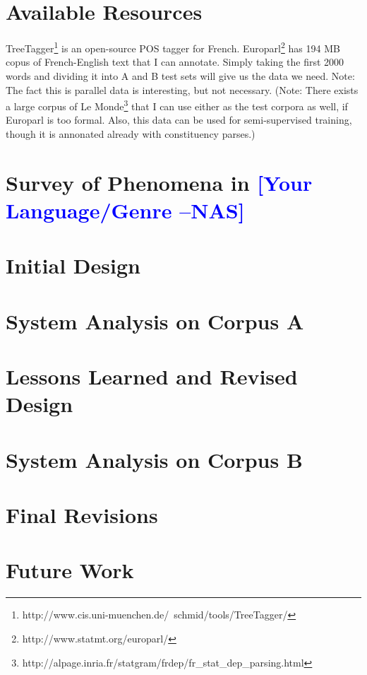 \documentclass[11pt,letterpaper]{article}
\newcommand{\nascomment}[1]{\textcolor{blue}{\textbf{[#1 --NAS]}}}
\begin{document}
\section{Available Resources}
TreeTagger\footnote{http://www.cis.uni-muenchen.de/~schmid/tools/TreeTagger/} is an open-source POS tagger for French. Europarl\footnote{http://www.statmt.org/europarl/} has 194 MB copus of French-English text that I can annotate. Simply taking the first 2000 words and dividing it into A and B test sets will give us the data we need. Note: The fact this is parallel data is interesting, but not necessary. (Note: There exists a large corpus of Le Monde\footnote{http://alpage.inria.fr/statgram/frdep/fr_stat_dep_parsing.html} that I can use either as the test corpora as well, if Europarl is too formal. Also, this data can be used for semi-supervised training, though it is annonated already with constituency parses.) 

\section{Survey of Phenomena in \nascomment{Your Language/Genre}}

\section{Initial Design}

\section{System Analysis on Corpus A}

\section{Lessons Learned and Revised Design}

\section{System Analysis on Corpus B}

\section{Final Revisions}

\section{Future Work}







\label{lastpage}
\end{document}
